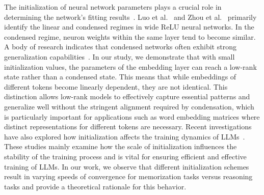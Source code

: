 The initialization of neural network parameters plays a crucial role in determining the network's fitting results~\cite{arora2019exact, chizat_global_2018, zhang_type_2019, e2020comparative, jacot_neural_2018, mei_mean_2018, rotskoff_parameters_2018, sirignano_mean_2020, williams_gradient_2019}. Luo et al.~\cite{luo2021phase} and Zhou et al.~\cite{zhou2022empirical} primarily identify the linear and condensed regimes in wide ReLU neural networks. In the condensed regime, neuron weights within the same layer tend to become similar. A body of research indicates that condensed networks often exhibit strong generalization capabilities~\cite{zhang2022linear, zhang2023loss, zhang2023stochastic, zhang2024implicit}. In our study, we demonstrate that with small initialization values, the parameters of the embedding layer can reach a low-rank state rather than a condensed state. This means that while embeddings of different tokens become linearly dependent, they are not identical. This distinction allows low-rank models to effectively capture essential patterns and generalize well without the stringent alignment required by condensation, which is particularly important for applications such as word embedding matrices where distinct representations for different tokens are necessary. Recent investigations have also explored how initialization affects the training dynamics of LLMs~\cite{huang2020improving, liu2020understanding, trockman2023mimetic, wang2024deepnet, zhang2019improving, zhu2021gradinit}. These studies mainly examine how the scale of initialization influences the stability of the training process and is vital for ensuring efficient and effective training of LLMs. In our work, we observe that different initialization schemes result in varying speeds of convergence for memorization tasks versus reasoning tasks and provide a theoretical rationale for this behavior.